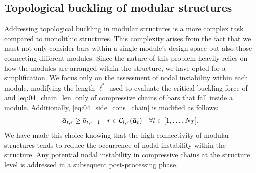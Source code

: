 \subsection{Topological buckling of modular structures}
Addressing topological buckling in modular structures is a more complex task compared to monolithic structures. This complexity arises from the fact that we must not only consider bars within a single module's design space but also those connecting different modules. Since the nature of this problem heavily relies on how the modules are arranged within the structure, we have opted for a simplification. We focus only on the assessment of nodal instability within each module, modifying the length $\ell^*$ used to evaluate the critical buckling force of  and \eqref{eq:04_chain_len} only of compressive chains of bars that fall inside a module. Additionally, \eqref{eq:04_side_cons_chain} is modified as follows:
\begin{equation}\label{eq:05_side_cons_chain_modular}
    \bar{\bm{a}}_{t,r} \geq \bar{a}_{t,r=1} \quad r \in \mathcal{C}_{l,r}(\bar{\bm{a}}_t) \quad \forall t \in [1,\dots,N_T].
\end{equation}
We have made this choice knowing that the high connectivity of modular structures tends to reduce the occurrence of nodal instability within the structure. Any potential nodal instability in compressive chains at the structure level is addressed in a subsequent post-processing phase.

